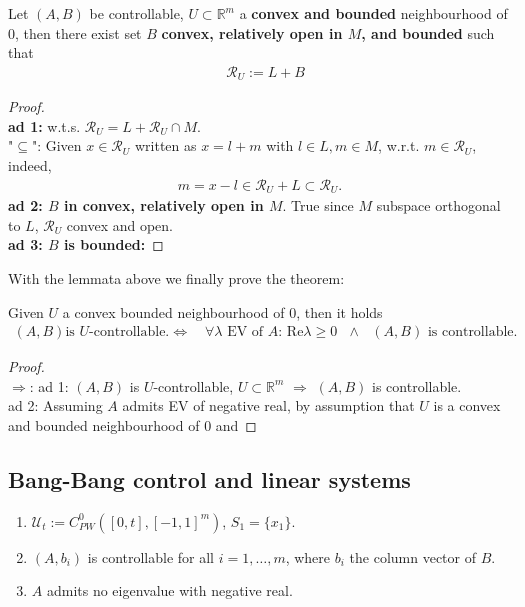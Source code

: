 \begin{lemma}
Let $(A, B)$ be controllable, $U \subset \mathbb{R}^m$ a \textbf{convex and bounded} neighbourhood of 0, then there exist set $B$ \textbf{convex, relatively open in $M$,  and bounded} such that
	\begin{align*}
		& \mathcal{R}_U:= L + B 
	\end{align*}
\end{lemma}
\begin{proof}
\quad\\
\textbf{ad 1: } w.t.s. $\mathcal{R}_U = L + \mathcal{R}_U \cap M$. \\
"$\subseteq$": Given $x \in \mathcal{R}_U$ written as $x = l + m$ with $l \in L, m \in M$, w.r.t. $m \in \mathcal{R}_U$, indeed, 
\begin{align*}
	m = x - l \in \mathcal{R}_U + L \subset \mathcal{R}_U.
\end{align*}
\textbf{ad 2: $B$ in convex, relatively open in $M$}. True since $M$ subspace orthogonal to $L$, $\mathcal{R}_U$ convex and open. \\
\textbf{ad 3: $B$ is bounded:}   
\end{proof}

With the lemmata above we finally prove the theorem: 
\begin{theorem}
	Given $U$ a convex bounded neighbourhood of $0$, then it holds
	\begin{align*}
		(A, B) \text{is $U$-controllable.} \Leftrightarrow  \quad \forall \lambda \text{ EV of $A$: } \text{Re} \lambda \ge 0  \text{ $\wedge$ }(A, B) \text{ is controllable. }
	\end{align*}
\end{theorem} 
\begin{proof}
	\quad\\
	$\Rightarrow$: ad 1: $(A, B)$ is $U$-controllable, $U \subset \mathbb{R}^m$ $\Rightarrow$ $(A, B)$ is controllable. \\
	ad 2: Assuming $A$ admits EV of negative real, by assumption that $U$ is a convex and bounded neighbourhood of $0$ and 
\end{proof}



\subsection{Bang-Bang control and linear systems}
\begin{enumerate}
	\item $\mathcal{U}_t:= C^0_{PW}([0, t], [-1, 1]^m)$, $S_1 = \{x_1\}.$ 
	\item $(A, b_i)$ is controllable for all $i = 1, \dots, m$, where $b_i$ the column vector of $B$. 
	\item $A$ admits no eigenvalue with negative real. 
\end{enumerate}






